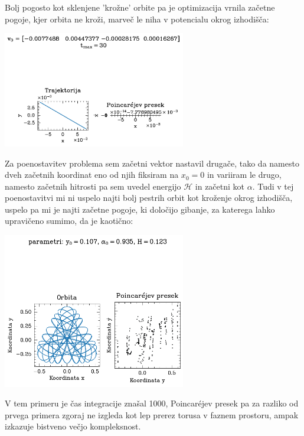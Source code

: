 Bolj pogosto kot sklenjene 'krožne' orbite pa je optimizacija vrnila začetne pogoje, kjer orbita ne kroži, marveč le niha v potencialu okrog izhodišča:
\begin{center}
    \includegraphics[width=0.6\textwidth]{../images/2-1-periorbita-2.pdf}
    \end{center}

Za poenostavitev problema sem začetni vektor nastavil drugače, tako da namesto dveh začetnih koordinat eno od njih fiksiram na $x_0 = 0$ in variiram le drugo, namesto začetnih hitrosti pa sem uvedel energijo $\mathcal{H}$ in začetni kot $\alpha$. Tudi v tej poenostavitvi mi ni uspelo najti bolj pestrih orbit kot kroženje okrog izhodišča, uspelo pa mi je najti začetne pogoje, ki določijo gibanje, za katerega lahko upravičeno sumimo, da je kaotično:

\begin{center}
    \includegraphics[width=0.6\textwidth]{../images/2024-2-kaoticna.png}
\end{center}
V tem primeru je čas integracije znašal 1000, Poincar\'{e}jev presek pa za razliko od prvega primera zgoraj ne izgleda kot lep prerez torusa v faznem prostoru, ampak izkazuje bistveno večjo kompleksnost.
